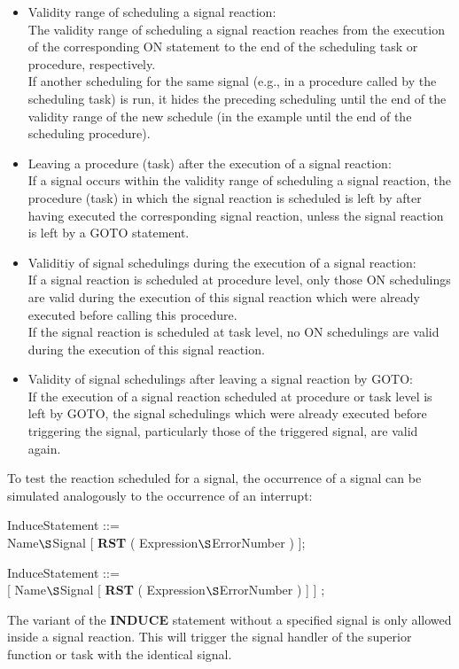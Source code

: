 \begin{itemize}
\item Validity range of scheduling a signal reaction:\\
The validity range of scheduling a signal reaction reaches from the
execution of the corresponding ON statement to the end of the
scheduling task or procedure, respectively.\\
If another scheduling for the same signal (e.g., in a procedure called
by the scheduling task) is run, it hides the preceding scheduling until
the end of the validity range of the new schedule (in the example until
the end of the scheduling procedure).
\item Leaving a procedure (task) after the execution of a signal
reaction:\\
If a signal occurs within the validity range of scheduling a signal
reaction, the procedure (task) in which the signal reaction is scheduled
is left by   after having executed the 
corresponding signal reaction, unless the signal reaction is left by a 
GOTO statement.
\item Validitiy of signal schedulings during the execution of a signal
reaction:\\
If a signal reaction is scheduled at procedure level, only those ON
schedulings are valid during the execution of this signal reaction which
were already executed before calling this procedure.\\
If the signal reaction is scheduled at task level, no ON schedulings are
valid during the execution of this signal reaction.
\item Validity of signal schedulings after leaving a signal reaction by
GOTO:\\
If the execution of a signal reaction scheduled at procedure or task
level is left by GOTO, the signal schedulings which were already
executed before triggering the signal, particularly those of the
triggered signal, are valid again.
\end{itemize}

To test the reaction scheduled for a signal, the occurrence of a signal
can be simulated analogously to the occurrence of an interrupt:

\begin{removed}
InduceStatement ::=\\
 Name$\S $Signal [ {\bf RST} ( Expression$\S $ErrorNumber ) ];
\end{removed}
\begin{added}
InduceStatement ::=\\
 [ Name$\S $Signal [ {\bf RST} ( Expression$\S $ErrorNumber ) ] ] ;

The variant of the {\bf INDUCE} statement without a specified signal is 
only allowed inside a signal reaction. This will trigger the signal handler
of the superior function or task with the identical signal.
\end{added}


